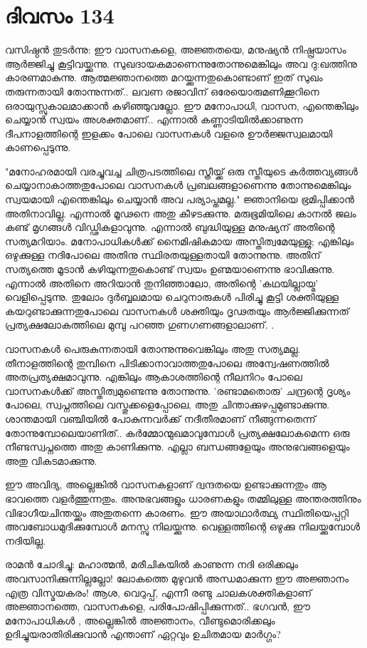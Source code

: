  
\section{ദിവസം 134}


വസിഷ്ഠന്‍ തുടര്‍ന്നു: ഈ വാസനകളെ, അജ്ഞതയെ, മനുഷ്യന്‍ നിഷ്പ്രയാസം ആര്‍ജ്ജിച്ചു കൂട്ടിവയ്ക്കുന്നു. സുഖദായകമാണെന്നുതോന്നുമെങ്കിലും അവ ദു:ഖത്തിനു കാരണമാകുന്നു. ആത്മജ്ഞാനത്തെ മറയ്ക്കുന്നതുകൊണ്ടാണ്‌ ഇത്‌ സുഖം തരുന്നതായി തോന്നുന്നത്‌..  ലവണ രജാവിന്‌ ഒരേയൊരുമണിക്കൂറിനെ ഒരായുസ്സുകാലമാക്കാന്‍ കഴിഞ്ഞുവല്ലോ. ഈ മനോപാധി, വാസന, എന്തെങ്കിലും ചെയ്യാന്‍ സ്വയം അശക്തമാണ്‌.. എന്നാല്‍ കണ്ണാടിയില്‍ക്കാണുന്ന ദീപനാളത്തിന്റെ ഇളക്കം പോലെ വാസനകള്‍ വളരെ ഊര്‍ജ്ജസ്വലമായി കാണപ്പെടുന്നു.

"മനോഹരമായി വരച്ചുവച്ച ചിത്രപടത്തിലെ സ്ത്രീയ്ക്ക്‌ ഒരു സ്തീയുടെ കര്‍ത്തവ്യങ്ങള്‍ ചെയ്യാനാകാത്തതുപോലെ വാസനകള്‍ പ്രബലങ്ങളാണെന്നു തോന്നുമെങ്കിലും സ്വയമായി എന്തെങ്കിലും ചെയ്യാന്‍ അവ പര്യാപ്തമല്ല." ജ്ഞാനിയെ ഭ്രമിപ്പിക്കാന്‍ അതിനാവില്ല. എന്നാല്‍ മൂഢനെ അതു കീഴടക്കുന്നു. മരുഭൂമിയിലെ കാനല്‍ ജലം കണ്ട്‌ മൃഗങ്ങള്‍ വിഡ്ഢികളാവുന്നു. എന്നാല്‍  ബുദ്ധിയുള്ള മനുഷ്യന്‌ അതിന്റെ സത്യമറിയാം. മനോപാധികള്‍ക്ക്‌ നൈമിഷികമായ അസ്തിത്വമേയുള്ളു; എങ്കിലും ഒഴുക്കുള്ള നദിപോലെ അതിനു സ്ഥിരതയുള്ളതായി തോന്നുന്നു. അതിന്‌ സത്യത്തെ മൂടാന്‍ കഴിയുന്നതുകൊണ്ട്‌ സ്വയം ഉണ്മയാണെന്നു ഭാവിക്കുന്നു. എന്നാല്‍ അതിനെ അറിയാന്‍ തുനിഞ്ഞാലോ, അതിന്റെ 'കഥയില്ലായ്മ' വെളിപ്പെടുന്നു. തുലോം ദുര്‍ബ്ബലമായ ചെറുനാരുകള്‍ പിരിച്ചു കൂട്ടി ശക്തിയുള്ള കയറുണ്ടാക്കുന്നതുപോലെ വാസനകള്‍ ശക്തിയും ദൃഢതയും ആര്‍ജ്ജിക്കുന്നത്‌ പ്രത്യക്ഷലോകത്തിലെ മുമ്പു പറഞ്ഞ ഗുണഗണങ്ങളാലാണ്‌. . 

വാസനകള്‍ പെരുകുന്നതായി തോന്നുന്നുവെങ്കിലും അതു സത്യമല്ല. തീനാളത്തിന്റെ തുമ്പിനെ പിടിക്കാനാവാത്തതുപോലെ അന്വേഷണത്തില്‍ അതപ്രത്യക്ഷമാവുന്നു. എങ്കിലും ആകാശത്തിന്റെ നീലനിറം പോലെ വാസനകള്‍ക്ക്‌ അസ്തിത്വമുണ്ടെന്നു തോന്നുന്നു. 'രണ്ടാമതൊരു' ചന്ദ്രന്റെ ദൃശ്യം പോലെ, സ്വപ്നത്തിലെ വസ്തുക്കളെപ്പോലെ, അതു ചിന്താക്കുഴപ്പമുണ്ടാക്കുന്നു. ശാന്തമായി വഞ്ചിയില്‍ പോകുന്നവര്‍ക്ക്‌ നദീതീരമാണ്‌ നീങ്ങുന്നതെന്ന് തോന്നുമ്പോലെയാണിത്‌..  കര്‍മ്മോന്മുഖമാവുമ്പോള്‍ പ്രത്യക്ഷലോകമെന്ന ഒരു നീണ്ടസ്വപ്നത്തെ അതു കാണിക്കുന്നു. എല്ലാ ബന്ധങ്ങളേയും അനുഭവങ്ങളെയും അതു വികടമാക്കുന്നു.

ഈ അവിദ്യ, അല്ലെങ്കില്‍ വാസനകളാണ്‌ ദ്വന്ദതയെ ഉണ്ടാക്കുന്നതും ആ ഭാവത്തെ വളര്‍ത്തുന്നതും. അനുഭവങ്ങളും ധാരണകളും തമ്മിലുള്ള അന്തരത്തിനും വിഭാഗീയചിന്തയ്ക്കും അതുതന്നെ കാരണം. ഈ അയാഥാര്‍ത്ഥ്യ സ്ഥിതിയെപ്പറ്റി അവബോധമുദിക്കുമ്പോള്‍ മനസ്സു നിലയ്ക്കുന്നു. വെള്ളത്തിന്റെ ഒഴുക്കു നിലയ്ക്കുമ്പോള്‍ നദിയില്ല.

രാമന്‍ ചോദിച്ചു: മഹാത്മന്‍, മരീചികയില്‍ കാണുന്ന നദി ഒരിക്കലും അവസാനിക്കുന്നില്ലല്ലോ! ലോകത്തെ മുഴുവന്‍ അന്ധമാക്കുന്ന ഈ അജ്ഞാനം എത്ര വിസ്മയകരം! ആശ, വെറുപ്പ്‌, എന്നീ രണ്ടു ചാലകശക്തികളാണ്‌ അജ്ഞാനത്തെ, വാസനകളെ, പരിപോഷിപ്പിക്കുന്നത്‌..  ഭഗവന്‍,   ഈ മനോപാധികള്‍ , അല്ലെങ്കില്‍ അജ്ഞാനം, വീണ്ടുമൊരിക്കലും ഉദിച്ചുയരാതിരിക്കുവാന്‍ എന്താണ്‌ ഏറ്റവും ഉചിതമായ മാര്‍ഗ്ഗം?

